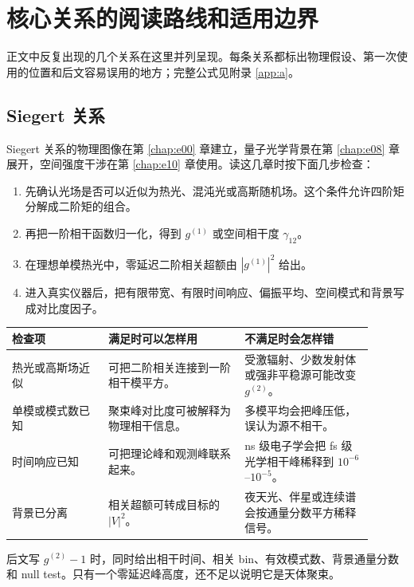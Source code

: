 \chapter{核心关系的阅读路线和适用边界}
\label{app:d}

正文中反复出现的几个关系在这里并列呈现。每条关系都标出物理假设、第一次使用的位置和后文容易误用的地方；完整公式见附录 \ref{app:a}。

\section{Siegert 关系}
\label{appsec:d-siegert}

Siegert 关系的物理图像在第 \ref{chap:e00} 章建立，量子光学背景在第 \ref{chap:e08} 章展开，空间强度干涉在第 \ref{chap:e10} 章使用。读这几章时按下面几步检查：

\begin{enumerate}[leftmargin=*]
\item 先确认光场是否可以近似为热光、混沌光或高斯随机场。这个条件允许四阶矩分解成二阶矩的组合。
\item 再把一阶相干函数归一化，得到 \(g^{(1)}\) 或空间相干度 \(\gamma_{12}\)。
\item 在理想单模热光中，零延迟二阶相关超额由 \(|g^{(1)}|^2\) 给出。
\item 进入真实仪器后，把有限带宽、有限时间响应、偏振平均、空间模式和背景写成对比度因子。
\end{enumerate}

\begin{longtable}{p{0.24\linewidth}p{0.34\linewidth}p{0.32\linewidth}}
\toprule
检查项 & 满足时可以怎样用 & 不满足时会怎样错 \\
\midrule
热光或高斯场近似 & 可把二阶相关连接到一阶相干模平方。 & 受激辐射、少数发射体或强非平稳源可能改变 \(g^{(2)}\)。 \\
单模或模式数已知 & 聚束峰对比度可被解释为物理相干信息。 & 多模平均会把峰压低，误认为源不相干。 \\
时间响应已知 & 可把理论峰和观测峰联系起来。 & ns 级电子学会把 fs 级光学相干峰稀释到 \(10^{-6}\)--\(10^{-5}\)。 \\
背景已分离 & 相关超额可转成目标的 \(|V|^2\)。 & 夜天光、伴星或连续谱会按通量分数平方稀释信号。 \\
\bottomrule
\end{longtable}

后文写 \(g^{(2)}-1\) 时，同时给出相干时间、相关 bin、有效模式数、背景通量分数和 null test。只有一个零延迟峰高度，还不足以说明它是天体聚束。


